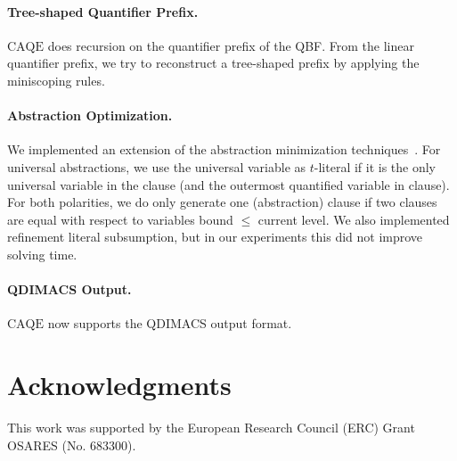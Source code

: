 \documentclass[11pt,twocolumn]{article}
\newcommand{\caqe}{\text{CAQE}}
\begin{document}
\paragraph{Tree-shaped Quantifier Prefix.}
$\caqe$ does recursion on the quantifier prefix of the QBF.
From the linear quantifier prefix, we try to reconstruct a tree-shaped prefix by applying the miniscoping rules. 

\paragraph{Abstraction Optimization.}

We implemented an extension of the abstraction minimization techniques~\cite{conf/sat/BalabanovJSMB16}.
For universal abstractions, we use the universal variable as $t$-literal if it is the only universal variable in the clause (and the outermost quantified variable in clause).
For both polarities, we do only generate one (abstraction) clause if two clauses are equal with respect to variables bound $\leq$ current level.
We also implemented refinement literal subsumption, but in our experiments this did not improve solving time.

\paragraph{QDIMACS Output.}

$\caqe$ now supports the QDIMACS output format.


\section{Acknowledgments}

This work was supported by the European Research Council (ERC) Grant OSARES (No. 683300).




\end{document}
